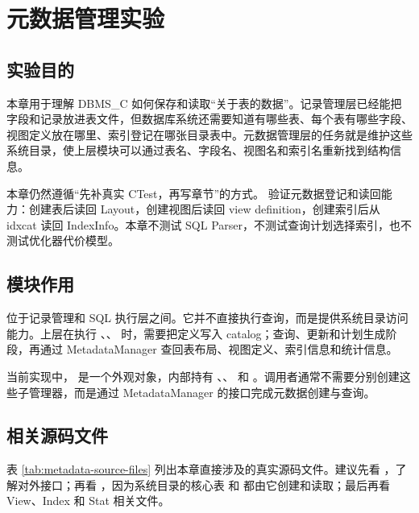 \chapter{元数据管理实验}
\label{chap:metadata}

\section{实验目的}
\label{sec:metadata-purpose}

本章用于理解 DBMS\_C 如何保存和读取“关于表的数据”。记录管理层已经能把字段和记录放进表文件，但数据库系统还需要知道有哪些表、每个表有哪些字段、视图定义放在哪里、索引登记在哪张目录表中。元数据管理层的任务就是维护这些系统目录，使上层模块可以通过表名、字段名、视图名和索引名重新找到结构信息。

本章仍然遵循“先补真实 CTest，再写章节”的方式。 验证元数据登记和读回能力：创建表后读回 Layout，创建视图后读回 view definition，创建索引后从 idxcat 读回 IndexInfo。本章不测试 SQL Parser，不测试查询计划选择索引，也不测试优化器代价模型。

\section{模块作用}
\label{sec:metadata-role}

 位于记录管理和 SQL 执行层之间。它并不直接执行查询，而是提供系统目录访问能力。上层在执行 、、 时，需要把定义写入 catalog；查询、更新和计划生成阶段，再通过 MetadataManager 查回表布局、视图定义、索引信息和统计信息。

当前实现中， 是一个外观对象，内部持有 、、 和 。调用者通常不需要分别创建这些子管理器，而是通过 MetadataManager 的接口完成元数据创建与查询。

\section{相关源码文件}
\label{sec:metadata-source-files}

表 \ref{tab:metadata-source-files} 列出本章直接涉及的真实源码文件。建议先看 ，了解对外接口；再看 ，因为系统目录的核心表  和  都由它创建和读取；最后再看 View、Index 和 Stat 相关文件。

